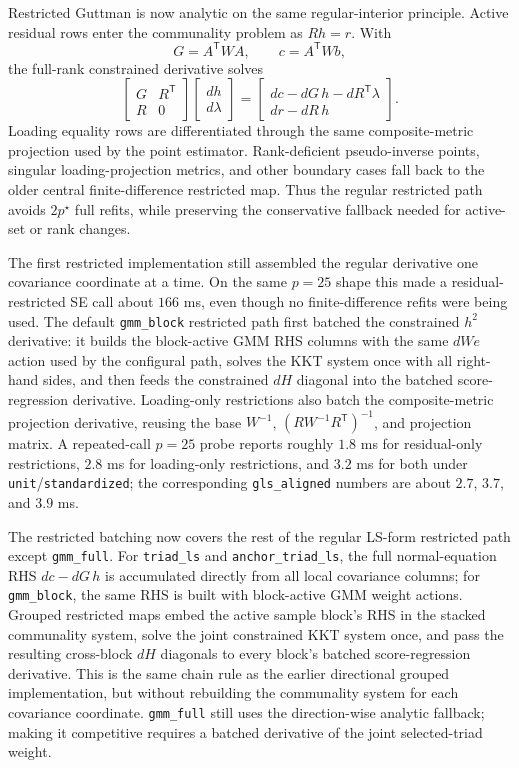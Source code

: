 \documentclass[11pt]{article}
\newcommand{\T}{^{\mathsf T}}
\theoremstyle{plain}
\theoremstyle{remark}
\begin{document}
Restricted Guttman is now analytic on the same regular-interior principle.
Active residual rows enter the communality problem as \(Rh=r\). With
\[
  G=A\T W A,\qquad c=A\T Wb,
\]
the full-rank constrained derivative solves
\[
  \begin{bmatrix}G&R\T\\R&0\end{bmatrix}
  \begin{bmatrix}dh\\d\lambda\end{bmatrix}
  =
  \begin{bmatrix}
    dc-dG\,h-dR\T\lambda\\
    dr-dR\,h
  \end{bmatrix}.
\]
Loading equality rows are differentiated through the same composite-metric
projection used by the point estimator. Rank-deficient pseudo-inverse points,
singular loading-projection metrics, and other boundary cases fall back to the
older central finite-difference restricted map. Thus the regular restricted
path avoids \(2p^\star\) full refits, while preserving the conservative
fallback needed for active-set or rank changes.

The first restricted implementation still assembled the regular derivative one
covariance coordinate at a time. On the same \(p=25\) shape this made a
residual-restricted SE call about \(166\) ms, even though no finite-difference
refits were being used. The default \texttt{gmm\_block} restricted path first
batched the constrained \(h^2\) derivative: it builds the block-active GMM RHS
columns with the same \(dW e\) action used by the configural path, solves the
KKT system once with all right-hand sides, and then feeds the constrained
\(dH\) diagonal into the batched score-regression derivative. Loading-only
restrictions also batch the composite-metric projection derivative, reusing the
base \(W^{-1}\), \((RW^{-1}R\T)^{-1}\), and projection matrix. A repeated-call
\(p=25\) probe reports roughly \(1.8\) ms for residual-only restrictions,
\(2.8\) ms for loading-only restrictions, and \(3.2\) ms for both under
\texttt{unit}/\texttt{standardized}; the corresponding \texttt{gls\_aligned}
numbers are about \(2.7\), \(3.7\), and \(3.9\) ms.

The restricted batching now covers the rest of the regular LS-form restricted
path except \texttt{gmm\_full}. For \texttt{triad\_ls} and
\texttt{anchor\_triad\_ls}, the full normal-equation RHS
\(dc-dG\,h\) is accumulated directly from all local covariance columns; for
\texttt{gmm\_block}, the same RHS is built with block-active GMM weight actions.
Grouped restricted maps embed the active sample block's RHS in the stacked
communality system, solve the joint constrained KKT system once, and pass the
resulting cross-block \(dH\) diagonals to every block's batched score-regression
derivative. This is the same chain rule as the earlier directional grouped
implementation, but without rebuilding the communality system for each
covariance coordinate. \texttt{gmm\_full} still uses the direction-wise analytic
fallback; making it competitive requires a batched derivative of the joint
selected-triad weight.
\end{document}
